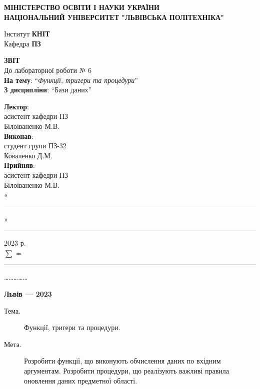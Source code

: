 \documentclass[14pt]{extreport}
\newcommand\subject{Бази даних}
\newcommand\lecturer{асистент кафедри ПЗ\\Білоіваненко М.В.}
\newcommand\teacher{асистент кафедри ПЗ\\Білоіваненко М.В.}
\newcommand\mygroup{ПЗ-32}
\newcommand\lab{6}
\newcommand\theme{Функції, тригери та процедури}
\newcommand\purpose{Розробити функції, що виконують обчислення даних по вхідним аргументам. Розробити процедури, що реалізують важливі правила оновлення даних предметної області}
\begin{document}
\begin{normalsize}
	\begin{titlepage}
		\thispagestyle{empty}
		\begin{center}
			\textbf{МІНІСТЕРСТВО ОСВІТИ І НАУКИ УКРАЇНИ\\
				НАЦІОНАЛЬНИЙ УНІВЕРСИТЕТ "ЛЬВІВСЬКА ПОЛІТЕХНІКА"}
		\end{center}
		\begin{flushright}
			Інститут \textbf{КНІТ}\\
			Кафедра \textbf{ПЗ}
		\end{flushright}
		\vspace{200pt}
		\begin{center}
			\textbf{ЗВІТ}\\
			\vspace{10pt}
			До лабораторної роботи № \lab\\
			\textbf{На тему}: “\textit{\theme}”\\
			\textbf{З дисципліни}: “\subject”
		\end{center}
		\vspace{40pt}
		\begin{flushright}
			
			\textbf{Лектор}:\\
			\lecturer\\
			\vspace{10pt}
			\textbf{Виконав}:\\
			
			студент групи \mygroup\\
			Коваленко Д.М.\\
			\vspace{10pt}
			\textbf{Прийняв}:\\
			
			\teacher\\
			
			\vspace{28pt}
			«\rule{1cm}{0.15mm}» \rule{1.5cm}{0.15mm} 2023 р.\\
			$\sum$ = \rule{1cm}{0.15mm}……………\\
			
		\end{flushright}
		\vspace{\fill}
		\begin{center}
			\textbf{Львів — 2023}
		\end{center}
	\end{titlepage}
		
	\begin{description}
		\item[Тема.] \theme.
		\item[Мета.] \purpose.
	\end{description}


\end{normalsize}
\end{document}

